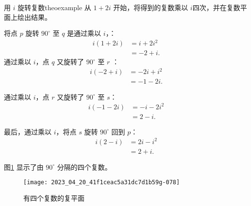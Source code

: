 \begin{myexample}{用 \boldmath $i$ 旋转复数}{theoexample}
从 $1+2 i$ 开始，将得到的复数乘以 $i$四次，并在复数平面上绘出结果。

将点 $p$ 旋转 $90^{\circ}$ 至 $q$ 是通过乘以 $i$，：
$$
    \begin{aligned}
        i(1+2 i) & =i+2 i^{2} \\
                 & =-2+i .
    \end{aligned}
$$
通过乘以 $i$，点 $q$ 又旋转了 $90^{\circ}$ 至 $r$ ：
$$
    \begin{aligned}
        i(-2+i) & =-2 i+i^{2} \\
                & =-1-2 i .
    \end{aligned}
$$

通过乘以 $i$，点 $r$ 又旋转了 $90^{\circ}$ 至 $s$：
$$
    \begin{aligned}
        i(-1-2 i) & =-i-2 i^{2} \\
                  & =2-i .
    \end{aligned}
$$

最后，通过乘以 $i$，将点 $s$ 旋转 $90^{\circ}$ 回到 $p$：
$$
    \begin{aligned}
        i(2-i) & =2 i-i^{2} \\
               & =2+i .
    \end{aligned}
$$

图\ref{fig:4.6} 显示了由 $90^{\circ}$ 分隔的四个复数。
\end{myexample}

\begin{figure}[htbp]
    \centering
    \texttt{[image: 2023\_04\_20\_41f1ceac5a31dc7d1b59g-078]}
    \caption{有四个复数的复平面}
    \label{fig:4.6}
\end{figure}

